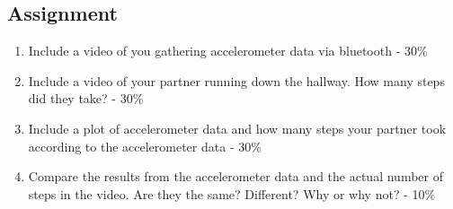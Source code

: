 \subsection{Assignment}



\begin{enumerate}[itemsep=-5pt]
\item Include a video of you gathering accelerometer data via bluetooth - 30\%
\item Include a video of your partner running down the hallway. How many steps did they take? - 30\%
\item Include a plot of accelerometer data and how many steps your partner took according to the accelerometer data - 30\%
\item Compare the results from the accelerometer data and the actual number of steps in the video. Are they the same? Different? Why or why not? - 10\%
\end{enumerate}
